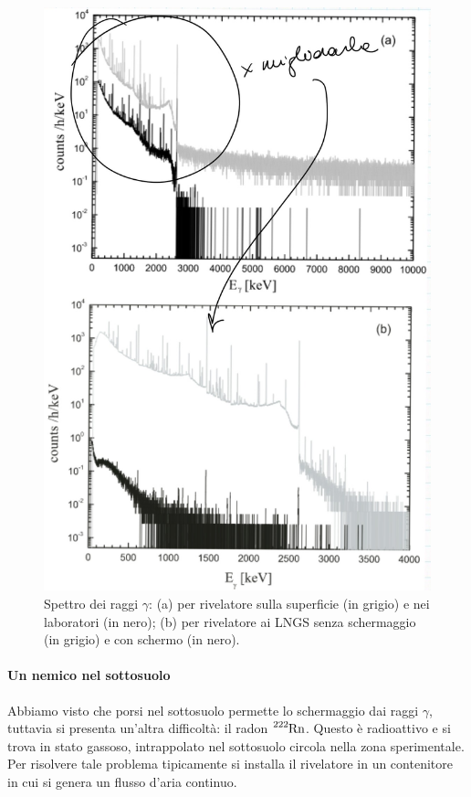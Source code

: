 \begin{figure}[!h]
	\centering
	\includegraphics[scale=0.2]{Immagini/0414_background.png}
	\caption{Spettro dei raggi $\gamma$: (a) per rivelatore sulla superficie (in grigio) e nei laboratori (in nero); (b) per rivelatore ai LNGS senza schermaggio (in grigio) e con schermo (in nero).}
	\label{0414_bckgamma}
\end{figure}

\paragraph{Un nemico nel sottosuolo} 
Abbiamo visto che porsi nel sottosuolo permette lo schermaggio dai raggi $\gamma$, tuttavia si presenta un'altra difficoltà: il radon $\ce{^{222}Rn}$. Questo è radioattivo e si trova in stato gassoso, intrappolato nel sottosuolo circola nella zona sperimentale. Per risolvere tale problema tipicamente si installa il rivelatore in un contenitore in cui si genera un flusso d'aria continuo.